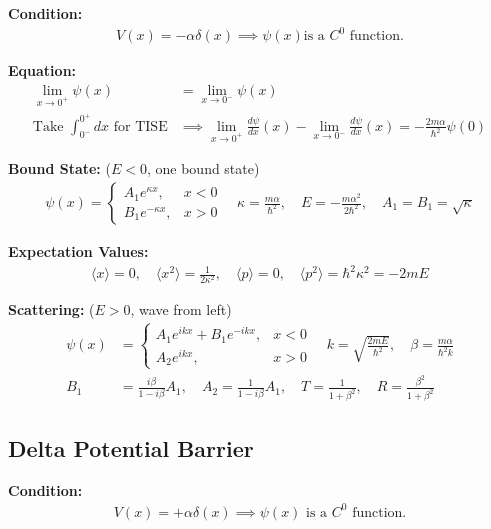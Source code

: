 \documentclass[12pt]{article}
\begin{document}
\textbf{Condition: }
\begin{align}
    V(x) = -\alpha \delta(x) \implies \psi(x) \text{is a $C^0$ function.} 
\end{align} 

\textbf{Equation: } 
\begin{align}
    \lim_{x \to 0^+} \psi(x) &= \lim_{x \to 0^-} \psi(x) \\ 
    \text{Take }\int_{0^-}^{0^+} dx \text{ for TISE} &\implies \lim_{x \to 0^+} \frac{d\psi}{dx}(x) - \lim_{x \to 0^-} \frac{d\psi}{dx}(x) = -\frac{2m\alpha}{\hbar^2} \psi(0) 
\end{align} 

\textbf{Bound State: } ($E < 0$, one bound state)
\begin{align}
    \psi(x) = \begin{cases}
    A_1 e^{\kappa x}, & x < 0 \\
    B_1 e^{-\kappa x}, & x > 0
\end{cases} \quad \kappa = \frac{m\alpha}{\hbar^2}, \quad E = -\frac{m\alpha^2}{2\hbar^2}, \quad A_1 = B_1 = \sqrt{\kappa}
\end{align}

\textbf{Expectation Values: }
\begin{align}
    \langle x \rangle = 0, \quad \langle x^2 \rangle = \frac{1}{2\kappa^2}, \quad \langle p \rangle = 0, \quad \langle p^2 \rangle = \hbar^2\kappa^2 = -2mE
\end{align}

\textbf{Scattering: } ($E > 0$, wave from left)
\begin{align}
    \psi(x) &= \begin{cases}
    A_1 e^{ikx} + B_1 e^{-ikx}, & x < 0 \\
    A_2 e^{ikx}, & x > 0
\end{cases} \quad k = \sqrt{\frac{2mE}{\hbar^2}}, \quad \beta = \frac{m\alpha}{\hbar^2 k} \\
B_1 &= \frac{i\beta}{1-i\beta} A_1, \quad A_2 = \frac{1}{1-i\beta} A_1, \quad T = \frac{1}{1+\beta^2}, \quad R = \frac{\beta^2}{1+\beta^2}
\end{align}

\subsection{Delta Potential Barrier}

\textbf{Condition: }
\begin{align}
    V(x) = +\alpha \delta(x) \implies \psi(x) \text{ is a $C^0$ function.}
\end{align}
\end{document}
